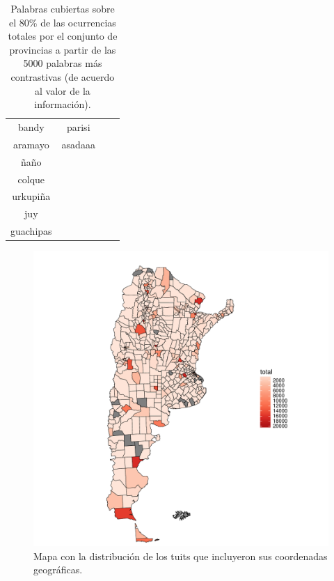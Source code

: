 \begin{table}
{\begin{tabular}{|c|c|c|c|}
bandy       & parisi           &                                &                            \\
aramayo     & asadaaa          &                                &                            \\
ñaño        &                  &                                &                            \\
colque      &                  &                                &                            \\
urkupiña    &                  &                                &                            \\
juy         &                  &                                &                            \\
guachipas   &                  &                                &                            \\ \hline
\end{tabular}%
}
\caption{Palabras cubiertas sobre el 80\% de las ocurrencias totales por el conjunto de provincias a partir de las 5000 palabras más contrastivas (de acuerdo al valor de la información).}
\label{tab:palabrasRegiones}
\end{table}

\begin{figure}[ht]
\centering
\includegraphics[width=1.0\textwidth]{./images/mapaGPS.pdf}
\caption{Mapa con la distribución de los tuits que incluyeron sus coordenadas geográficas. } 
\label{fig:mapaGPS} 
\end{figure}